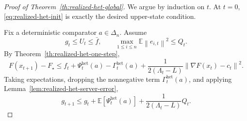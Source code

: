 \documentclass{article}
\theoremstyle{definition}
\newcommand{\EE}{\mathbb E}
\newcommand{\norm}[1]{\left\lVert #1\right\rVert}
\begin{document}
\begin{proof}[Proof of Theorem~\ref{th:realized-het-global}]
We argue by induction on $t$. At $t=0$, \eqref{eq:realized-het-init} is exactly the desired upper-state
condition.

Fix a deterministic comparator $a\in\Delta_n$. Assume
\[
g_t\le U_t\le \bar f,
\qquad
\max_{1\le i\le n}\EE\norm{e_{i,t}}^2\le Q_t.
\]
By Theorem~\ref{th:realized-het-one-step},
\[
F(x_{t+1})-F_\star
\le
f_t+\Psi_t^{\mathrm{het}}(a)-\Gamma_t^{\mathrm{het}}(a)
+\frac{1}{2(\Lambda_t-L)}\norm{\nabla F(x_t)-c_t}^2.
\]
Taking expectations, dropping the nonnegative term $\Gamma_t^{\mathrm{het}}(a)$, and applying
Lemma~\ref{lem:realized-het-server-error},
\begin{equation}
g_{t+1}
\le
g_t+\EE[\Psi_t^{\mathrm{het}}(a)]
+\frac{1}{2(\Lambda_t-L)}Q_t.
\label{eq:realized-het-global-start}\end{equation}


\end{proof}
\end{document}
